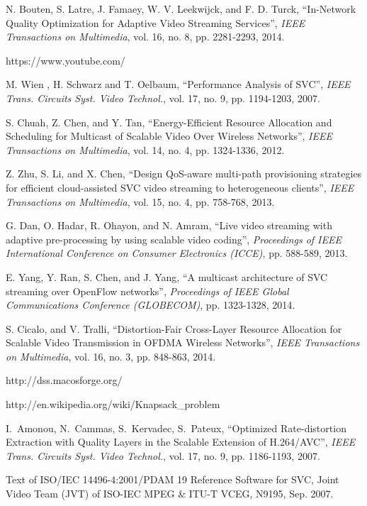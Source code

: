 \documentclass[journal,draftclsnofoot,onecolumn]{IEEEtran}
\begin{document}
\begin{thebibliography}{1}
N. Bouten, S. Latre, J. Famaey, W. V. Leekwijck, and F. D. Turck, ``In-Network Quality Optimization for Adaptive Video Streaming Services'', {\em IEEE Transactions on Multimedia}, vol. 16, no. 8, pp. 2281-2293, 2014.

https://www.youtube.com/

M. Wien , H. Schwarz and T. Oelbaum,  ``Performance Analysis of SVC'', {\em IEEE Trans. Circuits Syst. Video Technol.}, vol. 17, no. 9, pp. 1194-1203, 2007.

S. Chuah, Z. Chen, and Y. Tan, ``Energy-Efficient Resource Allocation and Scheduling for Multicast of Scalable Video Over Wireless Networks'', {\em IEEE Transactions on Multimedia}, vol. 14, no. 4, pp. 1324-1336, 2012.

Z. Zhu, S. Li, and X. Chen, ``Design QoS-aware multi-path provisioning strategies for efficient cloud-assisted SVC video streaming to heterogeneous clients'', {\em IEEE Transactions on Multimedia}, vol. 15, no. 4, pp. 758-768, 2013.

G. Dan, O. Hadar, R. Ohayon, and N. Amram, ``Live video streaming with adaptive pre-processing by using scalable video coding'', {\em Proceedings of IEEE International Conference on Consumer Electronics (ICCE)}, pp. 588-589, 2013.

E. Yang, Y. Ran, S. Chen, and J. Yang, ``A multicast architecture of SVC streaming over OpenFlow networks'', {\em Proceedings of IEEE Global Communications Conference (GLOBECOM)}, pp. 1323-1328, 2014.

S. Cicalo, and V. Tralli, ``Distortion-Fair Cross-Layer Resource Allocation for Scalable Video Transmission in OFDMA Wireless Networks'', {\em IEEE Transactions on Multimedia}, vol. 16, no. 3, pp. 848-863, 2014.

http://dss.macosforge.org/

http://en.wikipedia.org/wiki/Knapsack\_problem

I.~Amonou, N.~Cammas, S.~Kervadec, S.~Pateux, ``Optimized Rate-distortion Extraction with Quality Layers in the Scalable Extension of H.264/AVC'', {\em IEEE Trans. Circuits Syst. Video Technol.}, vol. 17, no. 9, pp. 1186-1193, 2007.

Text of ISO/IEC 14496-4:2001/PDAM 19 Reference Software for SVC, Joint Video Team (JVT) of ISO-IEC MPEG \& ITU-T VCEG, N9195, Sep. 2007.


\end{thebibliography}
\end{document}
